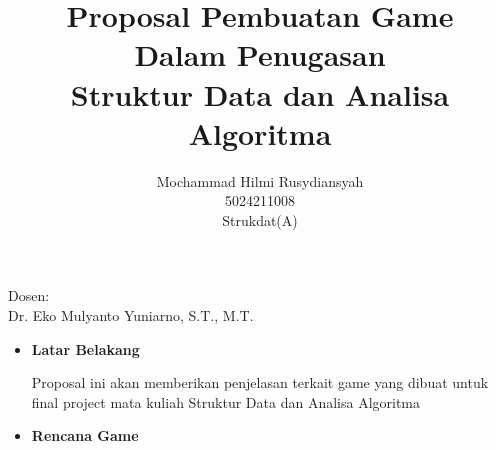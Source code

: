 \documentclass[12pt]{extarticle}
\title{Proposal Pembuatan Game\\Dalam Penugasan\\Struktur Data dan Analisa Algoritma}
\author{Mochammad Hilmi Rusydiansyah\\5024211008\\Strukdat(A)}
\begin{document}
	
	\maketitle
	\begin{center}
		\large{
			Dosen:
			\\
			Dr. Eko Mulyanto Yuniarno, S.T., M.T.
		}
	\end{center}
	\newpage
	
	\begin{itemize}
		\item \large{\textbf{Latar Belakang}}
			\begin{description}
				Proposal ini akan memberikan penjelasan terkait game yang dibuat untuk final project mata kuliah Struktur Data dan Analisa Algoritma
			\end{description}
		\item \large{\textbf{Rencana Game}}
			
	\end{itemize}
	
	
\end{document}
